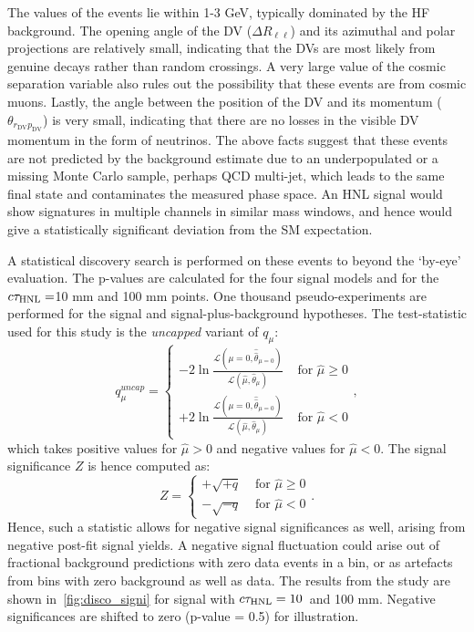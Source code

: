 The \mdv values of the events lie within 1-3 GeV, typically dominated by the HF background. The opening angle of the DV ($\Delta R_{\ell\ell}$) and its azimuthal and polar projections are relatively small, indicating that the DVs are most likely from genuine decays rather than random crossings. A very large value of the cosmic separation variable also rules out the possibility that these events are from cosmic muons. Lastly, the angle between the position of the DV and its momentum ($\theta_{r_\mathrm{DV}p_\mathrm{DV}}$) is very small, indicating that there are no losses in the visible DV momentum in the form of neutrinos. The above facts suggest that these events are not predicted by the background estimate due to an underpopulated or a missing Monte Carlo sample, perhaps QCD multi-jet, which leads to the same final state and contaminates the measured phase space. An HNL signal would show signatures in multiple channels in similar mass windows, and hence would give a statistically significant deviation from the SM expectation.

A statistical discovery search is performed on these events to beyond the `by-eye' evaluation. The p-values are calculated for the four signal models and for the $c\tau_\mathrm{HNL}=$10 mm and 100 mm points. One thousand pseudo-experiments are performed for the signal and signal-plus-background hypotheses. The test-statistic used for this study is the \textit{uncapped} variant of $q_{\mu}$:
\begin{equation}
    q_\mu^{uncap} = 
    \begin{cases} 
    -2\ln\frac{\mathcal{L}(\mu=0, \hat{\hat{\theta}}_{\mu=0})}{\mathcal{L}(\hat{\mu}, \hat{\theta}_\mu)} & \text { for } \hat{\mu} \geq 0 \\ 
    +2 \ln \frac{\mathcal{L}(\mu=0, \hat{\hat{\theta}}_{\mu=0})}{\mathcal{L}(\hat{\mu}, \hat{\theta}_\mu)} & \text { for } \hat{\mu}<0
    \end{cases}
    ,
\end{equation}
which takes positive values for $\hat{\mu}>0$ and negative values for $\hat{\mu}<0$. The signal significance $Z$ is hence computed as:
\begin{equation}
    Z = 
    \begin{cases} 
    +\sqrt{+q} & \text { for } \hat{\mu} \geq 0 \\ 
    -\sqrt{-q} & \text { for } \hat{\mu} < 0
    \end{cases}.
\end{equation}
Hence, such a statistic allows for negative signal significances as well, arising from negative post-fit signal yields. A negative signal fluctuation could arise out of fractional background predictions with zero data events in a bin, or as artefacts from bins with zero background as well as data. The results from the study are shown in~\cref{fig:disco_signi} for signal with $c\tau_\mathrm{HNL}=10$~and 100 mm. Negative significances are shifted to zero (p-value = 0.5) for illustration.

